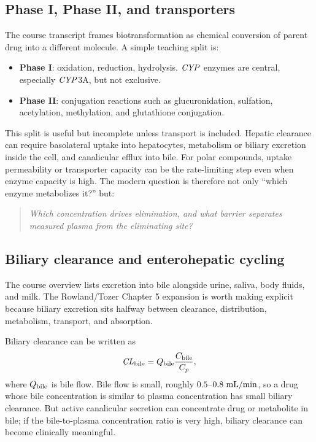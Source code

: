 \documentclass[a4paper]{article}
\newcommand{\CLbile}{\ensuremath{\pksym{CL}_{\pklab{bile}}}}
\newcommand{\CYP}{\ensuremath{\pksym{CYP}}}
\begin{document}
\subsection{Phase I, Phase II, and transporters}

The course transcript frames biotransformation as chemical conversion of parent drug into a different molecule. A simple teaching split is:
\begin{itemize}[leftmargin=2em]
  \item \textbf{Phase I}: oxidation, reduction, hydrolysis. \CYP{} enzymes are central, especially \CYP{}3A, but not exclusive.
  \item \textbf{Phase II}: conjugation reactions such as glucuronidation, sulfation, acetylation, methylation, and glutathione conjugation.
\end{itemize}
This split is useful but incomplete unless transport is included. Hepatic clearance can require basolateral uptake into hepatocytes, metabolism or biliary excretion inside the cell, and canalicular efflux into bile. For polar compounds, uptake permeability or transporter capacity can be the rate-limiting step even when enzyme capacity is high. The modern question is therefore not only ``which enzyme metabolizes it?'' but:
\begin{quote}
\itshape
Which concentration drives elimination, and what barrier separates measured plasma from the eliminating site?
\end{quote}

\subsection{Biliary clearance and enterohepatic cycling}

The course overview lists excretion into bile alongside urine, saliva, body fluids, and milk. The Rowland/Tozer Chapter 5 expansion is worth making explicit because biliary excretion sits halfway between clearance, distribution, metabolism, transport, and absorption.

Biliary clearance can be written as
\[
  \CLbile
  =
  Q_{\pklab{bile}}
  \frac{C_{\pklab{bile}}}{C_p},
\]
where \(Q_{\mathrm{bile}}\) is bile flow. Bile flow is small, roughly \(0.5\)--\(0.8\ \mathrm{mL/min}\), so a drug whose bile concentration is similar to plasma concentration has small biliary clearance. But active canalicular secretion can concentrate drug or metabolite in bile; if the bile-to-plasma concentration ratio is very high, biliary clearance can become clinically meaningful.
\end{document}
